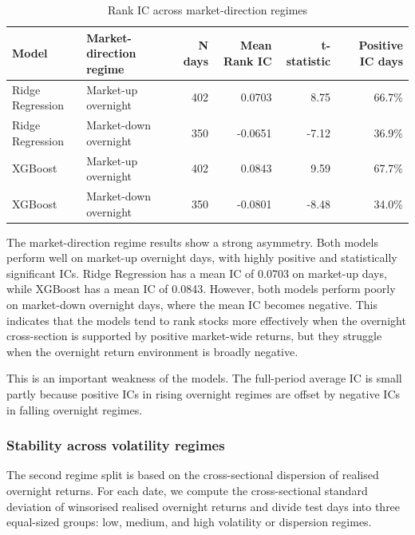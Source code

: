 \documentclass[12pt]{article}
\begin{document}
\begin{table}[htbp]
\centering
\small
\caption{Rank IC across market-direction regimes}
\label{tab:market_direction_ic}
\begin{tabular}{llrrrr}
\toprule
Model & Market-direction regime & N days & Mean Rank IC & t-statistic & Positive IC days \\
\midrule
Ridge Regression & Market-up overnight & 402 & 0.0703 & 8.75 & 66.7\% \\
Ridge Regression & Market-down overnight & 350 & -0.0651 & -7.12 & 36.9\% \\
\midrule
XGBoost & Market-up overnight & 402 & 0.0843 & 9.59 & 67.7\% \\
XGBoost & Market-down overnight & 350 & -0.0801 & -8.48 & 34.0\% \\
\bottomrule
\end{tabular}
\end{table}

The market-direction regime results show a strong asymmetry. Both models perform well on market-up overnight days, with highly positive and statistically significant ICs. Ridge Regression has a mean IC of 0.0703 on market-up days, while XGBoost has a mean IC of 0.0843. However, both models perform poorly on market-down overnight days, where the mean IC becomes negative. This indicates that the models tend to rank stocks more effectively when the overnight cross-section is supported by positive market-wide returns, but they struggle when the overnight return environment is broadly negative.

This is an important weakness of the models. The full-period average IC is small partly because positive ICs in rising overnight regimes are offset by negative ICs in falling overnight regimes.

\subsubsection{Stability across volatility regimes}

The second regime split is based on the cross-sectional dispersion of realised overnight returns. For each date, we compute the cross-sectional standard deviation of winsorised realised overnight returns and divide test days into three equal-sized groups: low, medium, and high volatility or dispersion regimes.
\end{document}
